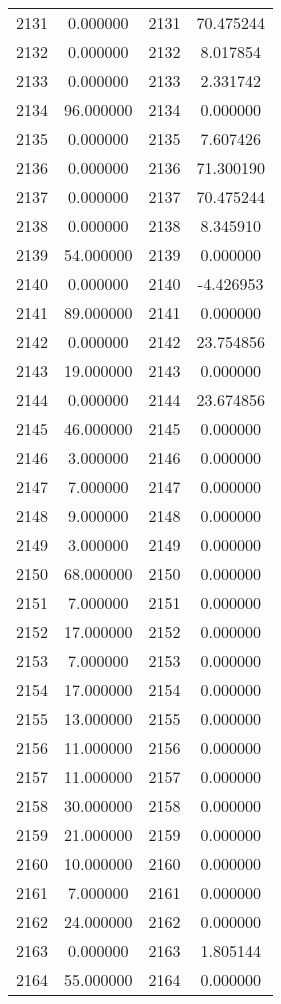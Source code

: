 \documentclass[12pt]{article}
\begin{document}
\begin{longtable}{@{}cccc@{}}
2131 & 0.000000 & 2131 & 70.475244 \\
2132 & 0.000000 & 2132 & 8.017854 \\
2133 & 0.000000 & 2133 & 2.331742 \\
2134 & 96.000000 & 2134 & 0.000000 \\
2135 & 0.000000 & 2135 & 7.607426 \\
2136 & 0.000000 & 2136 & 71.300190 \\
2137 & 0.000000 & 2137 & 70.475244 \\
2138 & 0.000000 & 2138 & 8.345910 \\
2139 & 54.000000 & 2139 & 0.000000 \\
2140 & 0.000000 & 2140 & -4.426953 \\
2141 & 89.000000 & 2141 & 0.000000 \\
2142 & 0.000000 & 2142 & 23.754856 \\
2143 & 19.000000 & 2143 & 0.000000 \\
2144 & 0.000000 & 2144 & 23.674856 \\
2145 & 46.000000 & 2145 & 0.000000 \\
2146 & 3.000000 & 2146 & 0.000000 \\
2147 & 7.000000 & 2147 & 0.000000 \\
2148 & 9.000000 & 2148 & 0.000000 \\
2149 & 3.000000 & 2149 & 0.000000 \\
2150 & 68.000000 & 2150 & 0.000000 \\
2151 & 7.000000 & 2151 & 0.000000 \\
2152 & 17.000000 & 2152 & 0.000000 \\
2153 & 7.000000 & 2153 & 0.000000 \\
2154 & 17.000000 & 2154 & 0.000000 \\
2155 & 13.000000 & 2155 & 0.000000 \\
2156 & 11.000000 & 2156 & 0.000000 \\
2157 & 11.000000 & 2157 & 0.000000 \\
2158 & 30.000000 & 2158 & 0.000000 \\
2159 & 21.000000 & 2159 & 0.000000 \\
2160 & 10.000000 & 2160 & 0.000000 \\
2161 & 7.000000 & 2161 & 0.000000 \\
2162 & 24.000000 & 2162 & 0.000000 \\
2163 & 0.000000 & 2163 & 1.805144 \\
2164 & 55.000000 & 2164 & 0.000000 \\

\end{longtable}
\end{document}
